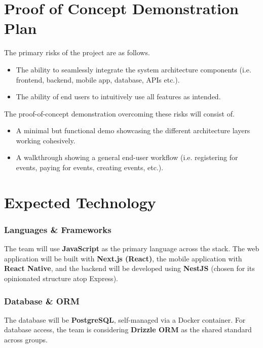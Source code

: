 \documentclass{article}
\begin{document}

\section{Proof of Concept Demonstration Plan}

The primary risks of the project are as follows.
\begin{itemize}
    \item The ability to seamlessly integrate the system architecture components (i.e. frontend, backend, mobile app, database, APIs etc.).
    \item The ability of end users to intuitively use all features as intended.
\end{itemize}

\noindent The proof-of-concept demonstration overcoming these risks will consist of.

\begin{itemize}
    \item A minimal but functional demo showcasing the different architecture layers working cohesively.
    \item A walkthrough showing a general end-user workflow (i.e. registering for events, paying for events, creating events, etc.).
\end{itemize}

\section{Expected Technology}

\subsubsection*{Languages \& Frameworks} 
The team will use \textbf{JavaScript} as the primary language across the stack. 
The web application will be built with \textbf{Next.js (React)}, the mobile application with \textbf{React Native}, 
and the backend will be developed using \textbf{NestJS} (chosen for its opinionated structure atop Express).

\subsubsection*{Database \& ORM} 
The database will be \textbf{PostgreSQL}, self-managed via a Docker container. 
For database access, the team is considering \textbf{Drizzle ORM} as the shared standard across groups.
\end{document}
